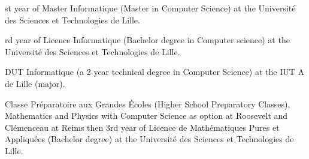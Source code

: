 \begin{rubric}{
}
\textup{st} year of Master Informatique (Master in Computer Science) at the Université des Sciences et Technologies de Lille.

\textup{rd} year of Licence Informatique (Bachelor degree in Computer science) at the Université des Sciences et Technologies de Lille.

\entry*[2009 - 2011]
DUT Informatique (a 2 year technical degree in Computer Science)  at the IUT A de Lille (major).

\entry*[2005 - 2009]
Classe Préparatoire aux Grandes Écoles (Higher School Preparatory Classes), Mathematics and Physics with Computer Science as option at Roosevelt and Clémenceau at Reims then 3\textup{rd} year of Licence de Mathématiques Pures et Appliquées (Bachelor degree) at the Université des Sciences et Technologies de Lille.



\end{rubric}
